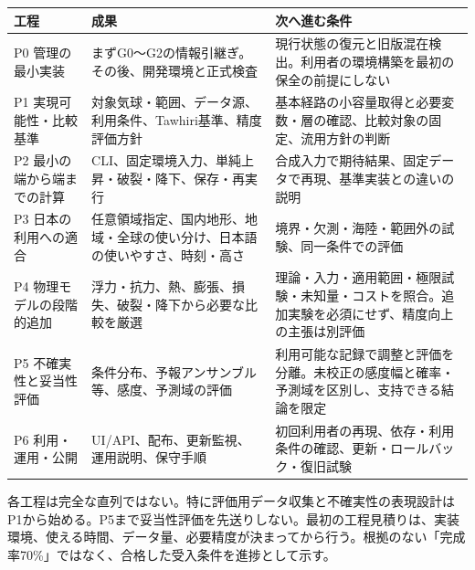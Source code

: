 \documentclass[11pt,a4paper]{article}
\newcounter{none}
\begin{document}
{\def\LTcaptype{none} %
\begin{longtable}[]{@{}
  >{\raggedright\arraybackslash}p{}
  >{\raggedright\arraybackslash}p{}
  >{\raggedright\arraybackslash}p{}@{}}
\toprule\noalign{}
\begin{minipage}[b]{\linewidth}\raggedright
工程
\end{minipage} & \begin{minipage}[b]{\linewidth}\raggedright
成果
\end{minipage} & \begin{minipage}[b]{\linewidth}\raggedright
次へ進む条件
\end{minipage} \\
\midrule\noalign{}
\endhead
\bottomrule\noalign{}
\endlastfoot
P0 管理の最小実装 & まずG0〜G2の情報引継ぎ。その後、開発環境と正式検査 &
現行状態の復元と旧版混在検出。利用者の環境構築を最初の保全の前提にしない \\
P1 実現可能性・比較基準 &
対象気球・範囲、データ源、利用条件、Tawhiri基準、精度評価方針 &
基本経路の小容量取得と必要変数・層の確認、比較対象の固定、流用方針の判断 \\
P2 最小の端から端までの計算 &
CLI、固定環境入力、単純上昇・破裂・降下、保存・再実行 &
合成入力で期待結果、固定データで再現、基準実装との違いの説明 \\
P3 日本の利用への適合 &
任意領域指定、国内地形、地域・全球の使い分け、日本語の使いやすさ、時刻・高さ
& 境界・欠測・海陸・範囲外の試験、同一条件での評価 \\
P4 物理モデルの段階的追加 &
浮力・抗力、熱、膨張、損失、破裂・降下から必要な比較を厳選 &
理論・入力・適用範囲・極限試験・未知量・コストを照合。追加実験を必須にせず、精度向上の主張は別評価 \\
P5 不確実性と妥当性評価 &
条件分布、予報アンサンブル等、感度、予測域の評価 &
利用可能な記録で調整と評価を分離。未校正の感度幅と確率・予測域を区別し、支持できる結論を限定 \\
P6 利用・運用・公開 & UI/API、配布、更新監視、運用説明、保守手順 &
初回利用者の再現、依存・利用条件の確認、更新・ロールバック・復旧試験 \\
\end{longtable}
}

各工程は完全な直列ではない。特に評価用データ収集と不確実性の表現設計はP1から始める。P5まで妥当性評価を先送りしない。最初の工程見積りは、実装環境、使える時間、データ量、必要精度が決まってから行う。根拠のない「完成率70\%」ではなく、合格した受入条件を進捗として示す。
\end{document}

